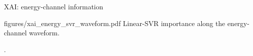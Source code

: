\begin{frame}{XAI: energy-channel information}
\small
\vspace{-2mm}

\centering
\smartimage[0.90\textwidth]{0.8\textheight}
{figures/xai_energy_svr_waveform.pdf}
{Linear-SVR importance along the energy-channel waveform.}

\vspace{-0.25em}


.


\end{frame}
